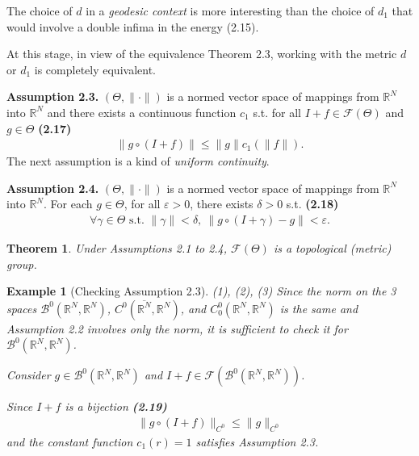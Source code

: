 \documentclass{book}
\numberwithin{equation}{section}
\newtheorem{theorem}{Theorem}[section]
\newtheorem{example}{Example}[section]
\begin{document}
\begin{enumerate}
    The choice of $d$ in a \textit{geodesic context} is more interesting than the choice of $d_1$ that would involve a double infima in the energy (2.15).
    
    At this stage, in view of the equivalence Theorem 2.3, working with the metric $d$ or $d_1$ is completely equivalent.
    
    \textbf{Assumption 2.3.} $(\Theta,\|\cdot\|)$ is a normed vector space of mappings from $\mathbb{R}^N$ into $\mathbb{R}^N$ and there exists a continuous function $c_1$ s.t. for all $I + f\in\mathcal{F}(\Theta)$ and $g\in\Theta$ \textbf{(2.17)}
    \begin{align*}
        \left\|g\circ(I + f)\right\|\le\|g\|c_1\left(\|f\|\right).
    \end{align*}
    The next assumption is a kind of \textit{uniform continuity}.
    
    \textbf{Assumption 2.4.} $(\Theta,\|\cdot\|)$ is a normed vector space of mappings from $\mathbb{R}^N$ into $\mathbb{R}^N$. For each $g\in\Theta$, for all $\varepsilon > 0$, there exists $\delta > 0$ s.t. \textbf{(2.18)}
    \begin{align*}
        \forall\gamma\in\Theta \mbox{ s.t. } \|\gamma\| < \delta,\ \left\|g\circ\left(I + \gamma\right) - g\right\| < \varepsilon.
    \end{align*}
    
    \begin{theorem}
        Under Assumptions 2.1 to 2.4, $\mathcal{F}(\Theta)$ is a topological (metric) group.
    \end{theorem}

    \begin{example}[Checking Assumption 2.3]
        (1), (2), (3) Since the norm on the 3 spaces $\mathcal{B}^0(\mathbb{R}^N,\mathbb{R}^N)$, $C^0(\overline{\mathbb{R}^N},\mathbb{R}^N)$, and $C_0^0(\mathbb{R}^N,\mathbb{R}^N)$ is the same and Assumption 2.2 involves only the norm, it is sufficient to check it for $\mathcal{B}^0(\mathbb{R}^N,\mathbb{R}^N)$.
        
        Consider $g\in\mathcal{B}^0(\mathbb{R}^N,\mathbb{R}^N)$ and $I + f\in\mathcal{F}(\mathcal{B}^0(\mathbb{R}^N,\mathbb{R}^N))$.
        
        Since $I + f$ is a bijection \textbf{(2.19)}
        \begin{align*}
            \|g\circ(I + f)\|_{C^0}\le\|g\|_{C^0}
        \end{align*}
        and the constant function $c_1(r) = 1$ satisfies Assumption 2.3.
        

\end{example}
\end{enumerate}
\end{document}
